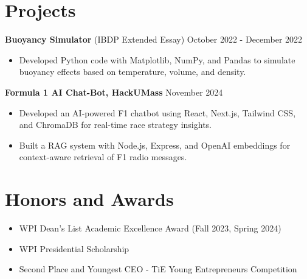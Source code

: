 \section*{Projects}
\textbf{Buoyancy Simulator} (IBDP Extended Essay) \hfill October 2022 - December 2022
\begin{itemize}
    \item Developed Python code with Matplotlib, NumPy, and Pandas to simulate buoyancy effects based on temperature, volume, and density.
\end{itemize}

\textbf{Formula 1 AI Chat-Bot, HackUMass} \hfill November 2024
\begin{itemize}
    \item Developed an AI-powered F1 chatbot using React, Next.js, Tailwind CSS, and ChromaDB for real-time race strategy insights.
    \item Built a RAG system with Node.js, Express, and OpenAI embeddings for context-aware retrieval of F1 radio messages.
\end{itemize}

\section*{Honors and Awards}
\begin{itemize}
    \item WPI Dean’s List Academic Excellence Award (Fall 2023, Spring 2024)
    \item WPI Presidential Scholarship
    \item Second Place and Youngest CEO - TiE Young Entrepreneurs Competition
\end{itemize}


